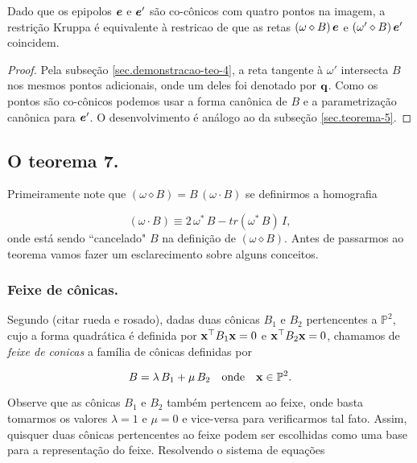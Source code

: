 \begin{teorema}
Dado que os epipolos $\boldsymbol{e}$ e $\boldsymbol{e}'$ são co-cônicos com quatro pontos na imagem, a restrição Kruppa é equivalente à restricao de que as retas $(\omega\diamond B)\,\boldsymbol{e}$ e $(\omega'\diamond B)\,\boldsymbol{e}'$ coincidem.
\end{teorema}

\begin{proof}
Pela subseção \ref{sec.demonstracao-teo-4}, a reta tangente à $\omega'$ intersecta $B$ nos mesmos pontos adicionais, onde um deles foi denotado por ${\bf q}$. Como os pontos são co-cônicos podemos usar a forma canônica de $B$ e a parametrização canônica para $\boldsymbol{e}'$. O desenvolvimento é análogo ao da subseção \ref{sec.teorema-5}.
\end{proof}

\subsection{O teorema 7.}


Primeiramente note que $(\omega \diamond B) = B\,(\omega \cdot B)$ se definirmos a homografia

\begin{equation}
(\omega \cdot B) \equiv 2\,\omega^*\,B - tr(\omega^*\,B)\,I,
\end{equation}
onde está sendo ``cancelado" $B$ na definição de $(\omega \diamond B)$. Antes de passarmos ao teorema vamos fazer um esclarecimento sobre alguns conceitos. 

\subsubsection{Feixe de cônicas.}

Segundo (citar rueda e rosado), dadas duas cônicas $B_1$ e $B_2$ pertencentes a $\mathbb{P}^2$, cujo a forma quadrática é definida por $\mathbf{x}^\top B_1\mathbf{x}=0$ e $\mathbf{x}^\top B_2\mathbf{x}=0$, chamamos de \textit{feixe de conicas} a família de cônicas definidas por

\begin{equation}
B=\lambda\,B_1+\mu\,B_2\quad\text{onde}\quad\mathbf{x}\in\mathbb{P}^2.
\end{equation}

Observe que as cônicas $B_1$ e $B_2$ também pertencem ao feixe, onde basta tomarmos os valores $\lambda=1$ e $\mu=0$ e vice-versa para verificarmos tal fato. Assim, quisquer duas cônicas pertencentes ao feixe podem ser escolhidas como uma base para a representação do feixe. Resolvendo o sistema de equações

